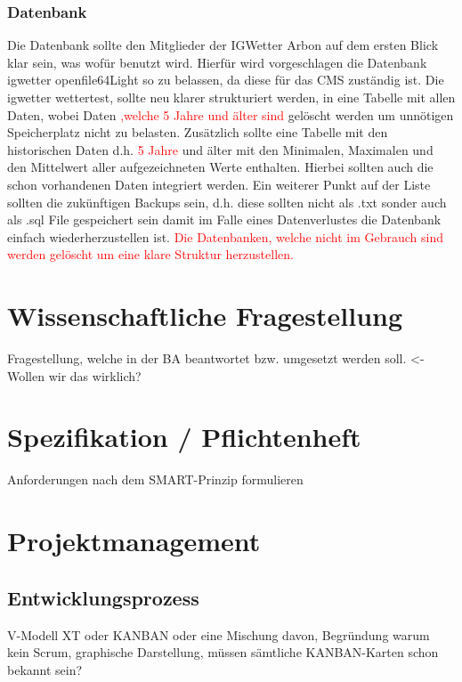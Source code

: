 \documentclass[a4paper,ngerman, 12pt]{report}
\newcommand\Diskussionspunkt[1]{\textcolor{red}{#1}}
\begin{document}
\subsection{Datenbank}
Die Datenbank sollte den Mitglieder der IGWetter Arbon auf dem ersten Blick klar sein, was wofür benutzt wird. Hierfür wird vorgeschlagen die Datenbank igwetter openfile64Light so zu belassen, da diese für das CMS zuständig ist. Die igwetter wettertest, sollte neu klarer strukturiert werden, in eine Tabelle mit allen Daten, wobei Daten \Diskussionspunkt{,welche 5 Jahre und älter sind} gelöscht werden um unnötigen Speicherplatz nicht zu belasten. Zusätzlich sollte eine Tabelle mit den historischen Daten d.h. \Diskussionspunkt{5 Jahre} und älter mit den Minimalen, Maximalen und den Mittelwert aller aufgezeichneten Werte enthalten. Hierbei sollten auch die schon vorhandenen Daten integriert werden. Ein weiterer Punkt auf der Liste sollten die zukünftigen Backups sein, d.h. diese sollten nicht als .txt sonder auch als .sql File gespeichert sein damit im Falle eines Datenverlustes die Datenbank einfach wiederherzustellen ist. \Diskussionspunkt{Die Datenbanken, welche nicht im Gebrauch sind werden gelöscht um eine klare Struktur herzustellen.}


\chapter{Wissenschaftliche Fragestellung}

Fragestellung, welche in der BA beantwortet bzw. umgesetzt werden soll. <- Wollen wir das wirklich?


\chapter{Spezifikation / Pflichtenheft}
Anforderungen nach dem SMART-Prinzip formulieren
   


\chapter{Projektmanagement}
\section{Entwicklungsprozess}
V-Modell XT oder KANBAN oder eine Mischung davon, Begründung warum kein Scrum, graphische Darstellung, müssen sämtliche KANBAN-Karten schon bekannt sein?
\end{document}

